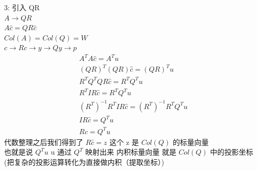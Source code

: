 \documentclass[12pt]{article}
\begin{document}
\begin{flushleft}
    3: 引入 QR \\
    $A \to QR$ \\
    $A\hat{c} = QR\hat{c}$ \\
    $Col(A) = Col(Q) = W$ \\
    $c \to Rc \to y \to Qy \to p$ \\
    \begin{align}
        A^{T}A\hat{c} = A^{T}u                               \\
        (QR)^{T}(QR)\hat{c} = (QR)^Tu                        \\
        R^{T}Q^{T}QR\hat{c} = R^{T}Q^{T}u                    \\
        R^{T}IR\hat{c} = R^{T}Q^{T}u                         \\
        (R^{T})^{-1}R^{T}IR\hat{c} = (R^{T})^{-1}R^{T}Q^{T}u \\
        IR\hat{c} = Q^{T}u                                   \\
        R\hat{c} = Q^{T}u
    \end{align}
    代数整理之后我们得到了 $R\hat{c} = z$ 这个 z 是 $Col(Q)$ 的标量向量 \\
    也就是说 $Q^{T}u$ u 通过 $Q^{T}$ 映射出来 内积标量向量 就是 $Col(Q)$ 中的投影坐标(把复杂的投影运算转化为直接做内积（提取坐标）) \\


\end{flushleft}
\end{document}
